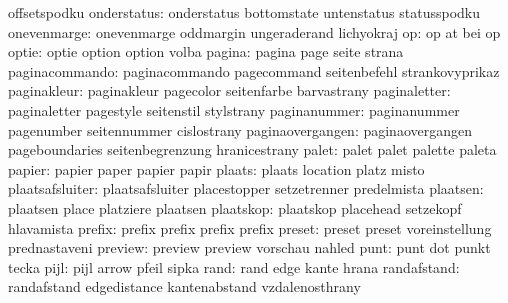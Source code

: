                        offsetspodku
         onderstatus:  onderstatus          bottomstate          untenstatus
                       statusspodku
         onevenmarge:  onevenmarge          oddmargin            ungeraderand
                       lichyokraj
                  op:  op                   at                   bei
                       op %
               optie:  optie                option               option
                       volba
              pagina:  pagina               page                 seite
                       strana
      paginacommando:  paginacommando       pagecommand          seitenbefehl
                       strankovyprikaz
         paginakleur:  paginakleur          pagecolor            seitenfarbe
                       barvastrany
        paginaletter:  paginaletter         pagestyle            seitenstil
                       stylstrany
        paginanummer:  paginanummer         pagenumber           seitennummer
                       cislostrany
    paginaovergangen:  paginaovergangen     pageboundaries       seitenbegrenzung
                       hranicestrany
               palet:  palet                palet                palette
                       paleta
              papier:  papier               paper                papier
                       papir
              plaats:  plaats               location             platz
                       misto
     plaatsafsluiter:  plaatsafsluiter      placestopper         setzetrenner
                       predelmista
            plaatsen:  plaatsen             place                platziere
                       plaatsen %
           plaatskop:  plaatskop            placehead            setzekopf
                       hlavamista
              prefix:  prefix               prefix               prefix
                       prefix
              preset:  preset               preset               voreinstellung
                       prednastaveni
             preview:  preview              preview              vorschau
                       nahled
                punt:  punt                 dot                  punkt
                       tecka
                pijl:  pijl                 arrow                pfeil
                       sipka
                rand:  rand                 edge                 kante
                       hrana
         randafstand:  randafstand          edgedistance         kantenabstand
                       vzdalenosthrany
